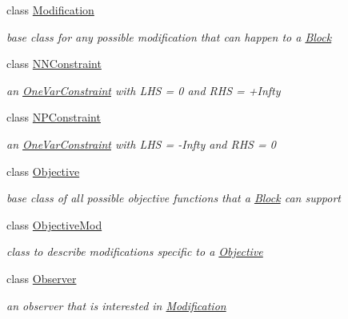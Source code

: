 \begin{DoxyCompactItemize}
class \mbox{\hyperlink{class_s_m_spp__di__unipi__it_1_1_modification}{Modification}}
\begin{DoxyCompactList}\small\item\em base class for any possible modification that can happen to a \mbox{\hyperlink{class_s_m_spp__di__unipi__it_1_1_block}{Block}} \end{DoxyCompactList}\item 
class \mbox{\hyperlink{class_s_m_spp__di__unipi__it_1_1_n_n_constraint}{N\+N\+Constraint}}
\begin{DoxyCompactList}\small\item\em an \mbox{\hyperlink{class_s_m_spp__di__unipi__it_1_1_one_var_constraint}{One\+Var\+Constraint}} with L\+HS = 0 and R\+HS = +\+Infty \end{DoxyCompactList}\item 
class \mbox{\hyperlink{class_s_m_spp__di__unipi__it_1_1_n_p_constraint}{N\+P\+Constraint}}
\begin{DoxyCompactList}\small\item\em an \mbox{\hyperlink{class_s_m_spp__di__unipi__it_1_1_one_var_constraint}{One\+Var\+Constraint}} with L\+HS = -\/\+Infty and R\+HS = 0 \end{DoxyCompactList}\item 
class \mbox{\hyperlink{class_s_m_spp__di__unipi__it_1_1_objective}{Objective}}
\begin{DoxyCompactList}\small\item\em base class of all possible objective functions that a \mbox{\hyperlink{class_s_m_spp__di__unipi__it_1_1_block}{Block}} can support \end{DoxyCompactList}\item 
class \mbox{\hyperlink{class_s_m_spp__di__unipi__it_1_1_objective_mod}{Objective\+Mod}}
\begin{DoxyCompactList}\small\item\em class to describe modifications specific to a \mbox{\hyperlink{class_s_m_spp__di__unipi__it_1_1_objective}{Objective}} \end{DoxyCompactList}\item 
class \mbox{\hyperlink{class_s_m_spp__di__unipi__it_1_1_observer}{Observer}}
\begin{DoxyCompactList}\small\item\em an observer that is interested in \mbox{\hyperlink{class_s_m_spp__di__unipi__it_1_1_modification}{Modification}} \end{DoxyCompactList}\item 

\end{DoxyCompactItemize}

